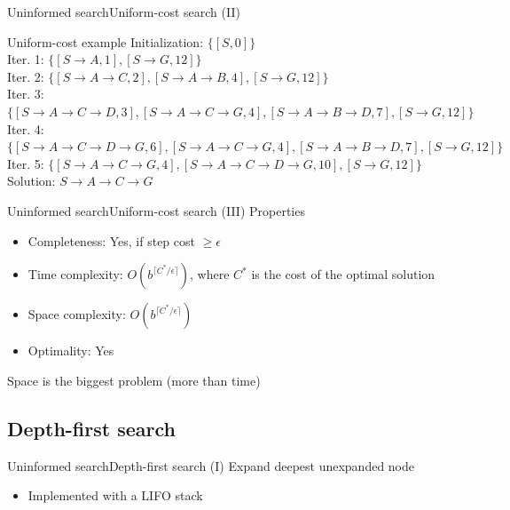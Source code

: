 \documentclass[10pt,compress]{beamer} %
\begin{document}
\begin{frame}[fragile]{Uninformed search}{Uniform-cost search (II)}
    \begin{exampleblock}{Uniform-cost example}
    \small{
    Initialization: $\{[S, 0]\}$\\
    Iter. 1: $\{[S \rightarrow A, 1], [S \rightarrow G, 12]\}$\\
    Iter. 2: $\{[S \rightarrow A \rightarrow C, 2], [S \rightarrow A \rightarrow B, 4], [S \rightarrow G, 12]\}$\\
    Iter. 3: $\{[S \rightarrow A \rightarrow C \rightarrow D, 3], [S \rightarrow A \rightarrow C \rightarrow G, 4], [S \rightarrow A \rightarrow B \rightarrow D, 7], [S \rightarrow G, 12]\}$\\
    Iter. 4: $\{[S \rightarrow A \rightarrow C \rightarrow D \rightarrow G, 6], [S \rightarrow A \rightarrow C \rightarrow G, 4], [S \rightarrow A \rightarrow B \rightarrow D, 7], [S \rightarrow G, 12]\}$\\
    Iter. 5: $\{[S \rightarrow A \rightarrow C \rightarrow G, 4], [S \rightarrow A \rightarrow C \rightarrow D \rightarrow G, 10], [S \rightarrow G, 12]\}$\\
    Solution: $S \rightarrow A \rightarrow C \rightarrow G$\\
    }
    \end{exampleblock}
\end{frame}

\begin{frame}[fragile]{Uninformed search}{Uniform-cost search (III)}
      Properties
      \begin{itemize}
        \item Completeness: Yes, if step cost $\ge\epsilon$
        \item Time complexity: $O(b^{\lceil C^{*}/\epsilon \rceil})$, where $C^{*}$ is the cost of the optimal solution
        \item Space complexity: $O(b^{\lceil C^{*}/\epsilon \rceil})$
        \item Optimality: Yes
      \end{itemize}
      Space is the biggest problem (more than time)
\end{frame}


\subsection{Depth-first search}

\begin{frame}{Uninformed search}{Depth-first search (I)}
    Expand deepest unexpanded node
    \begin{itemize}
        \item Implemented with a LIFO stack
    \end{itemize}
\end{frame}
\end{document}
